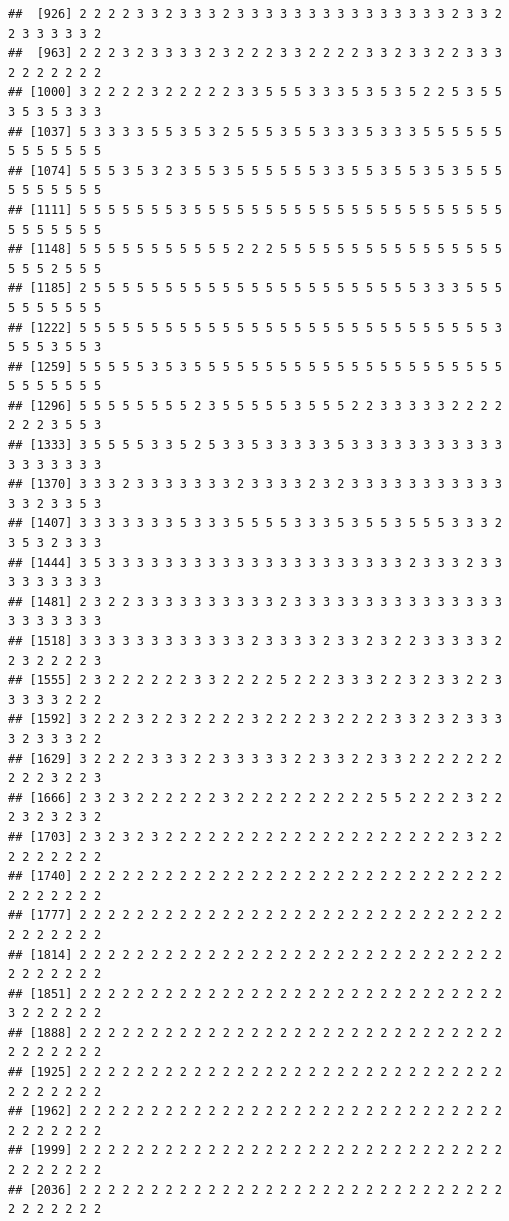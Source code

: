 \documentclass[
]{article}
\begin{document}
\begin{verbatim}
##  [926] 2 2 2 2 3 3 2 3 3 3 2 3 3 3 3 3 3 3 3 3 3 3 3 3 3 3 2 3 3 2 2 3 3 3 3 3 2
##  [963] 2 2 2 3 2 3 3 3 3 2 3 2 2 2 3 3 2 2 2 2 3 3 2 3 3 2 2 3 3 3 2 2 2 2 2 2 2
## [1000] 3 2 2 2 2 3 2 2 2 2 2 3 3 5 5 5 3 3 3 5 3 5 3 5 2 2 5 3 5 5 3 5 3 5 3 3 3
## [1037] 5 3 3 3 3 5 5 3 5 3 2 5 5 5 3 5 5 3 3 3 5 3 3 3 5 5 5 5 5 5 5 5 5 5 5 5 5
## [1074] 5 5 5 3 5 3 2 3 5 5 3 5 5 5 5 5 5 3 3 5 5 3 5 5 3 5 3 5 5 5 5 5 5 5 5 5 5
## [1111] 5 5 5 5 5 5 5 3 5 5 5 5 5 5 5 5 5 5 5 5 5 5 5 5 5 5 5 5 5 5 5 5 5 5 5 5 5
## [1148] 5 5 5 5 5 5 5 5 5 5 5 2 2 2 5 5 5 5 5 5 5 5 5 5 5 5 5 5 5 5 5 5 5 2 5 5 5
## [1185] 2 5 5 5 5 5 5 5 5 5 5 5 5 5 5 5 5 5 5 5 5 5 5 5 3 3 3 5 5 5 5 5 5 5 5 5 5
## [1222] 5 5 5 5 5 5 5 5 5 5 5 5 5 5 5 5 5 5 5 5 5 5 5 5 5 5 5 5 5 3 5 5 5 3 5 5 3
## [1259] 5 5 5 5 5 3 5 3 5 5 5 5 5 5 5 5 5 5 5 5 5 5 5 5 5 5 5 5 5 5 5 5 5 5 5 5 5
## [1296] 5 5 5 5 5 5 5 5 2 3 5 5 5 5 5 3 5 5 5 2 2 3 3 3 3 3 2 2 2 2 2 2 2 3 5 5 3
## [1333] 3 5 5 5 5 3 3 5 2 5 3 3 5 3 3 3 3 3 5 3 3 3 3 3 3 3 3 3 3 3 3 3 3 3 3 3 3
## [1370] 3 3 3 2 3 3 3 3 3 3 3 2 3 3 3 3 2 3 2 3 3 3 3 3 3 3 3 3 3 3 3 3 2 3 3 5 3
## [1407] 3 3 3 3 3 3 3 5 3 3 3 5 5 5 5 3 3 3 5 3 5 5 3 5 5 5 3 3 3 2 3 5 3 2 3 3 3
## [1444] 3 5 3 3 3 3 3 3 3 3 3 3 3 3 3 3 3 3 3 3 3 3 3 2 3 3 3 2 3 3 3 3 3 3 3 3 3
## [1481] 2 3 2 2 3 3 3 3 3 3 3 3 3 3 2 3 3 3 3 3 3 3 3 3 3 3 3 3 3 3 3 3 3 3 3 3 3
## [1518] 3 3 3 3 3 3 3 3 3 3 3 3 2 3 3 3 3 2 3 3 2 3 2 2 3 3 3 3 3 2 2 3 2 2 2 2 3
## [1555] 2 3 2 2 2 2 2 2 3 3 2 2 2 2 5 2 2 2 3 3 3 2 2 3 2 3 3 2 2 3 3 3 3 3 2 2 2
## [1592] 3 2 2 2 3 2 2 3 2 2 2 2 3 2 2 2 2 3 2 2 2 2 3 3 2 3 2 3 3 3 3 2 3 3 3 2 2
## [1629] 3 2 2 2 2 3 3 3 2 2 3 3 3 3 3 2 2 3 3 2 2 3 3 2 2 2 2 2 2 2 2 2 2 3 2 2 3
## [1666] 2 3 2 3 2 2 2 2 2 2 3 2 2 2 2 2 2 2 2 2 2 5 5 2 2 2 2 3 2 2 2 3 2 3 2 3 2
## [1703] 2 3 2 3 2 3 2 2 2 2 2 2 2 2 2 2 2 2 2 2 2 2 2 2 2 2 2 3 2 2 2 2 2 2 2 2 2
## [1740] 2 2 2 2 2 2 2 2 2 2 2 2 2 2 2 2 2 2 2 2 2 2 2 2 2 2 2 2 2 2 2 2 2 2 2 2 2
## [1777] 2 2 2 2 2 2 2 2 2 2 2 2 2 2 2 2 2 2 2 2 2 2 2 2 2 2 2 2 2 2 2 2 2 2 2 2 2
## [1814] 2 2 2 2 2 2 2 2 2 2 2 2 2 2 2 2 2 2 2 2 2 2 2 2 2 2 2 2 2 2 2 2 2 2 2 2 2
## [1851] 2 2 2 2 2 2 2 2 2 2 2 2 2 2 2 2 2 2 2 2 2 2 2 2 2 2 2 2 2 2 3 2 2 2 2 2 2
## [1888] 2 2 2 2 2 2 2 2 2 2 2 2 2 2 2 2 2 2 2 2 2 2 2 2 2 2 2 2 2 2 2 2 2 2 2 2 2
## [1925] 2 2 2 2 2 2 2 2 2 2 2 2 2 2 2 2 2 2 2 2 2 2 2 2 2 2 2 2 2 2 2 2 2 2 2 2 2
## [1962] 2 2 2 2 2 2 2 2 2 2 2 2 2 2 2 2 2 2 2 2 2 2 2 2 2 2 2 2 2 2 2 2 2 2 2 2 2
## [1999] 2 2 2 2 2 2 2 2 2 2 2 2 2 2 2 2 2 2 2 2 2 2 2 2 2 2 2 2 2 2 2 2 2 2 2 2 2
## [2036] 2 2 2 2 2 2 2 2 2 2 2 2 2 2 2 2 2 2 2 2 2 2 2 2 2 2 2 2 2 2 2 2 2 2 2 2 2

\end{verbatim}
\end{document}
